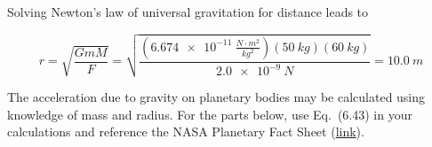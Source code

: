 \documentclass{exam}
\begin{document}
\begin{questions}
\begin{solution}
Solving Newton's law of universal gravitation for distance leads to

\begin{equation*}
    r = \sqrt{\frac{GmM}{F}} = 
    \sqrt{\frac{\left(\SI{6.674e-11}{\frac{N \cdot m^2}{kg^2}}\right) \left(\SI{50}{kg}\right) \left(\SI{60}{kg}\right)}{\SI{2.0e-9}{N}}} = \SI{10.0}{m}
\end{equation*}
\end{solution}

\question 
The acceleration due to gravity on planetary bodies may be calculated using knowledge of mass and radius. For the parts below, use Eq.~(6.43) in your calculations and reference the NASA Planetary Fact Sheet (\href{https://nssdc.gsfc.nasa.gov/planetary/factsheet/}{link}).

\end{questions}
\end{document}
